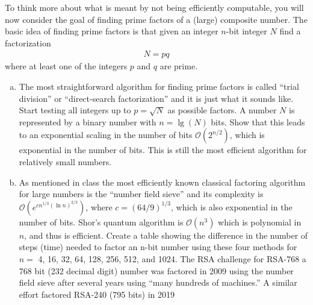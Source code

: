 \documentclass{book}
\theoremstyle{definition}
\newcommand{\lp}{\left(}
\newcommand{\rp}{\right)}
\begin{document}
To think more about what is meant by not being efficiently computable, you will now consider
the goal of finding prime factors of a (large) composite number. The basic idea of finding
prime factors is that given an integer $n$-bit integer $N$ find a factorization
\begin{align}
N = pq
\end{align}
where at least one of the integers $p$ and $q$ are prime.
\begin{enumerate}[(a)]
	\item The most straightforward algorithm for finding prime factors is called ``trial division'' or
	``direct-search factorization'' and it is just what it sounds like. Start testing all integers
	up to $p = \sqrt{N}$ as possible factors. A number $N$ is represented by a binary number
	with $n = \lg(N)$ bits. Show that this leads to an exponential scaling in the number of
	bits $\mathcal{O}(2^{n/2})$, which is exponential in the number of bits. This is still the most efficient algorithm for relatively small numbers.
	\item  As mentioned in class the most efficiently known classical factoring algorithm for large
	numbers is the ``number field sieve'' and its complexity is $\mathcal{O}\lp e^{cn^{1/3}(\ln n )^{2/3}}  \rp$, where $c =
	(64/9)^{1/3}$, which is also exponential in the number of bits. Shor’s quantum algorithm is $\mathcal{O}(n^3)$ which is polynomial in $n$, and thus is efficient. Create a table showing the
	difference in the number of steps (time) needed to factor an n-bit number using these
	four methods for $n =$ 4, 16, 32, 64, 128, 256, 512, and 1024. The RSA challenge for RSA-768 a 768 bit (232 decimal digit) number was factored in
	2009 using the number field sieve after several years using ``many hundreds of machines.''
	A similar effort factored RSA-240 (795 bits) in 2019
\end{enumerate}
\end{document}

